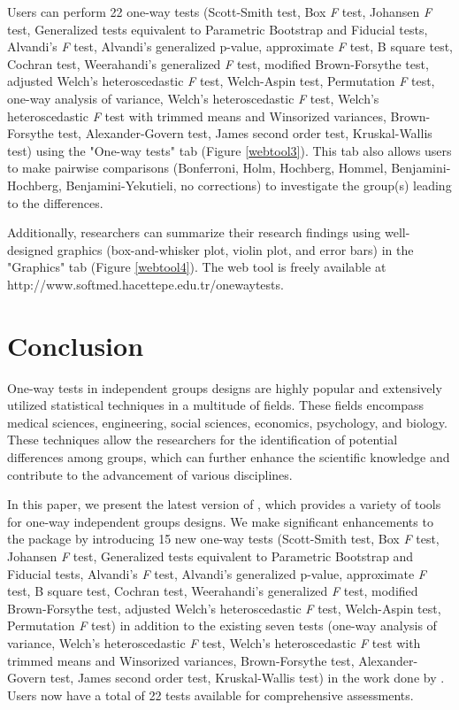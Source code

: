 Users can perform 22 one-way tests (Scott-Smith test, Box \textit{F} test, Johansen \textit{F} test, Generalized tests equivalent to Parametric Bootstrap and Fiducial tests, Alvandi's \textit{F} test, Alvandi's generalized p-value, approximate \textit{F} test, B square test, Cochran test, Weerahandi's generalized \textit{F} test, modified Brown-Forsythe test, adjusted Welch's heteroscedastic \textit{F} test, Welch-Aspin test, Permutation \textit{F} test, one-way analysis of variance, Welch's heteroscedastic \textit{F} test, Welch's heteroscedastic \textit{F} test with trimmed means and Winsorized variances, Brown-Forsythe test, Alexander-Govern test, James second order test, Kruskal-Wallis test) using the "One-way tests" tab (Figure \ref{webtool3}). This tab also allows users to make pairwise comparisons (Bonferroni, Holm, Hochberg, Hommel, Benjamini-Hochberg, Benjamini-Yekutieli, no corrections) to investigate the group(s) leading to the differences.

Additionally, researchers can summarize their research findings using well-designed  graphics (box-and-whisker plot, violin plot, and error bars) in the "Graphics" tab (Figure \ref{webtool4}). The web tool is freely available at http://www.softmed.hacettepe.edu.tr/onewaytests.

\section{Conclusion}

One-way tests in independent groups designs are highly popular and extensively utilized statistical techniques in a multitude of fields. These fields encompass medical sciences, engineering, social sciences, economics, psychology, and biology. These techniques allow the researchers for the identification of potential differences among groups, which can further enhance the scientific knowledge and contribute to the advancement of various disciplines.

In this paper, we present the latest version of , which provides a variety of tools for one-way independent groups designs. We make significant enhancements to the package by introducing 15 new one-way tests (Scott-Smith test, Box \textit{F} test, Johansen \textit{F} test, Generalized tests equivalent to Parametric Bootstrap and Fiducial tests, Alvandi's \textit{F} test, Alvandi's generalized p-value, approximate \textit{F} test, B square test, Cochran test, Weerahandi's generalized \textit{F} test, modified Brown-Forsythe test, adjusted Welch's heteroscedastic \textit{F} test, Welch-Aspin test, Permutation \textit{F} test) in addition to the existing seven tests (one-way analysis of variance, Welch's heteroscedastic \textit{F} test, Welch's heteroscedastic \textit{F} test with trimmed means and Winsorized variances, Brown-Forsythe test, Alexander-Govern test, James second order test, Kruskal-Wallis test) in the work done by \cite{dag2018onewaytests}. Users now have a total of 22 tests available for comprehensive assessments.

